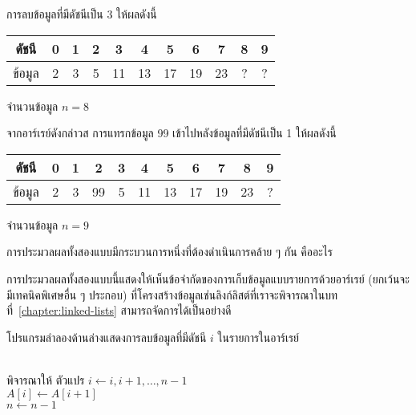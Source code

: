 การ{\wbr}ลบ{\wbr}ข้อมูล{\wbr}ที่{\wbr}มี{\wbr}ดัชนี{\wbr}เป็น 3 ให้{\wbr}ผล{\wbr}ดังนี้{\wbr}

\begin{center}
\begin{tabular}{|c|c|c|c|c|c|c|c|c|c|c|}
\hline
ดัชนี & 0 & 1 & 2 & 3 & 4 & 5 & 6 & 7 & 8 & 9\\
\hline
ข้อมูล & 2 & 3 & 5 & 11 & 13 & 17 & 19 & 23 & ? & ? \\
\hline
\end{tabular}

จำนวน{\wbr}ข้อมูล $n = 8$
\end{center}

จาก{\wbr}อาร์{\wbr}เรย์{\wbr}ดัง{\wbr}กล่าว{\wbr}ส การ{\wbr}แทรก{\wbr}ข้อมูล 99 เข้า{\wbr}ไป{\wbr}หลัง{\wbr}ข้อมูล{\wbr}ที่{\wbr}มี{\wbr}ดัชนี{\wbr}เป็น 1 ให้{\wbr}ผล{\wbr}ดังนี้{\wbr}

\begin{center}
\begin{tabular}{|c|c|c|c|c|c|c|c|c|c|c|}
\hline
ดัชนี & 0 & 1 & 2 & 3 & 4 & 5 & 6 & 7 & 8 & 9\\
\hline
ข้อมูล & 2 & 3 & 99 & 5 & 11 & 13 & 17 & 19 & 23 & ? \\
\hline
\end{tabular}

จำนวน{\wbr}ข้อมูล $n = 9$
\end{center}

\begin{quiz}{}
การ{\wbr}ประมวล{\wbr}ผล{\wbr}ทั้ง{\wbr}สอง{\wbr}แบบ{\wbr}มี{\wbr}กระบวนการ{\wbr}หนึ่ง{\wbr}ที่{\wbr}ต้อง{\wbr}ดำเนิน{\wbr}การ{\wbr}คล้าย ๆ กัน คือ{\wbr}อะไร{\wbr}
\end{quiz}

การ{\wbr}ประมวล{\wbr}ผล{\wbr}ทั้ง{\wbr}สอง{\wbr}แบบ{\wbr}นี้{\wbr}แสดง{\wbr}ให้{\wbr}เห็น{\wbr}ข้อ{\wbr}จำกัด{\wbr}ของ{\wbr}การ{\wbr}เก็บ{\wbr}ข้อมูล{\wbr}แบบ{\wbr}รายการ{\wbr}ด้วย{\wbr}อาร์{\wbr}เรย์
(ยกเว้น{\wbr}จะ{\wbr}มี{\wbr}เทคนิค{\wbr}พิเศษ{\wbr}อื่น ๆ ประกอบ)
ที่{\wbr}โครงสร้าง{\wbr}ข้อมูล{\wbr}เช่น{\wbr}ลิงก์{\wbr}ลิสต์{\wbr}ที่{\wbr}เรา{\wbr}จะ{\wbr}พิจารณา{\wbr}ใน{\wbr}บท{\wbr}ที่~\ref{chapter:linked-lists}
สามารถ{\wbr}จัดการ{\wbr}ได้{\wbr}เป็น{\wbr}อย่าง{\wbr}ดี{\wbr}

โปรแกรม{\wbr}ลำลอง{\wbr}ด้าน{\wbr}ล่าง{\wbr}แสดง{\wbr}การ{\wbr}ลบ{\wbr}ข้อมูล{\wbr}ที่{\wbr}มี{\wbr}ดัชนี $i$ ใน{\wbr}รายการ{\wbr}ใน{\wbr}อาร์{\wbr}เรย์

\begin{algt}
\label{algo:array-deletion1}
\\
\hspace*{0.2in} พิจารณา{\wbr}ให้ ตัวแปร $i\leftarrow i,i+1,\ldots,n-1$\\
\hspace*{0.2in}\hspace*{0.2in} $A[i]\leftarrow A[i+1]$\\
\hspace*{0.2in} $n\leftarrow n-1$
\end{algt}

